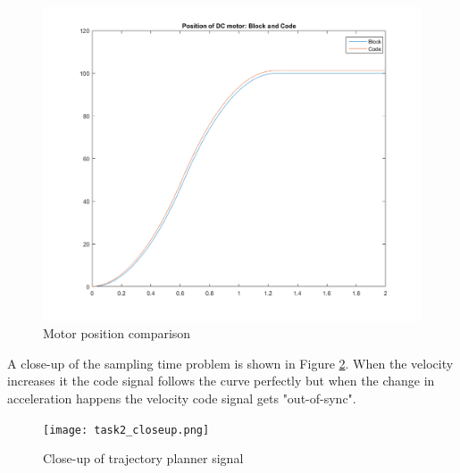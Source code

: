 \begin{figure}[H]
	\begin{center}
	
		\includegraphics[width=\linewidth]{task2_position.png}
		\caption{Motor position comparison}
		\label{fig:task2_pos}
	\end{center}
\end{figure}

A close-up of the sampling time problem is shown in Figure \ref{fig:task2_closeup}. When the velocity increases it the code signal follows the curve perfectly but when the change in acceleration happens the velocity code signal gets "out-of-sync".

\begin{figure}[H]
	\begin{center}
	
		\texttt{[image: task2\_closeup.png]}
		\caption{Close-up of trajectory planner signal}
		\label{fig:task2_closeup}
	\end{center}
\end{figure}



%
